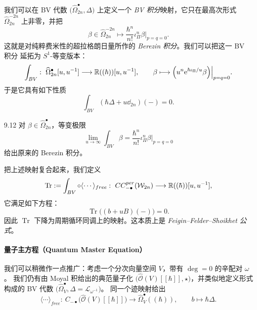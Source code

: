 我们可以在 BV 代数 $\big(\widehat{\Omega}^{\bullet}_{2n},\Delta\big)$ 上定义一个
\emph{BV 积分}映射，它只在最高次形式 $\widehat{\Omega}^{-2n}_{2n}$ 上非零，并把
\[
  \beta\in\widehat{\Omega}^{-2n}_{2n}
  \longmapsto
  \frac{\hbar^{n}}{n!}\iota^{n}_{\Pi}\beta\Big|_{p=q=0}.
\]
这就是对纯粹费米性的超拉格朗日量所作的 \emph{Berezin 积分}。我们可以把这一 BV 积分
延拓为 $S^{1}$-等变版本：
\[
  \int_{BV}:\ \widehat{\Omega}^{\bullet}_{2n}[u,u^{-1}]
  \longrightarrow\R((\hbar))[u,u^{-1}],
  \qquad
  \beta\longmapsto\Big(u^{n}\ee^{\hbar\iota_{\Pi}/u}\beta\Big)
  \Big|_{p=q=0}.
\]
于是它具有如下性质
\[
  \int_{BV}(\hbar\Delta+u\dd_{2n})(-)=0.
\]


\begin{wrem}{9.12}
  对 $\beta\in\widehat{\Omega}^{\bullet}_{2n}$，等变极限
  \[
    \lim_{u\to\infty}\int_{BV}\beta
    =\frac{\hbar^{n}}{n!}\iota^{n}_{\Pi}\beta\Big|_{p=q=0}
  \]
  给出原来的 Berezin 积分。
\end{wrem}

把上述映射复合起来，我们定义
\[
  \operatorname{Tr}:=\int_{BV}\circ\langle\cdots\rangle_{free}:\
  CC^{per}_{-\bullet}(\mathcal{W}_{2n})
  \longrightarrow\mathbb{R}((\hbar))[u,u^{-1}],
\]
它满足如下方程：
\[
  \operatorname{Tr}\big((b+uB)(-)\big)=0.
\]
因此 $\operatorname{Tr}$ 下降为周期循环同调上的映射。这本质上是
\emph{Feigin--Felder--Shoikhet 公式}。

\paragraph{量子主方程（Quantum Master Equation）}

我们可以稍微作一点推广：考虑一个分次向量空间 $V$，带有 $\deg=0$ 的辛配对 $\omega$。
我们仍有由 Moyal 积给出的典范量子化
$\big(\widehat{\mathcal{O}}(V)[[\hbar]],\star\big)$，并类似地定义形式构成的 BV 代数
$\big(\widehat{\Omega}^{\bullet}_{V},\Delta=\mathcal{L}_{\omega^{-1}}\big)$。
同一个迹映射给出
\[
  \langle\cdots\rangle_{free}:\ C_{-\bullet}\big(\widehat{\mathcal{O}}(V)[[\hbar]]\big)
  \longrightarrow\widehat{\Omega}^{\bullet}_{V}((\hbar)),
  \qquad b\longmapsto\hbar\Delta.
\]

